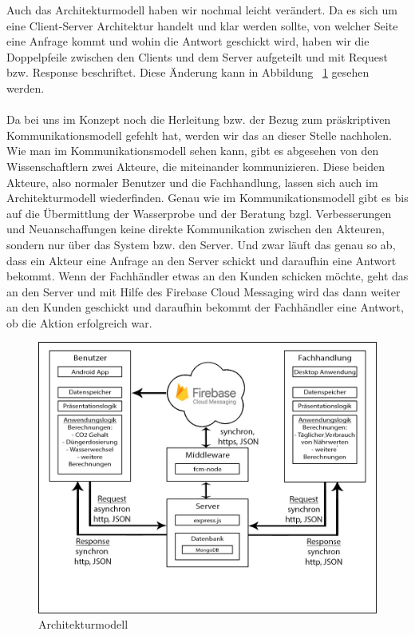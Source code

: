 Auch das Architekturmodell haben wir nochmal leicht verändert. Da es sich um eine Client-Server Architektur handelt und klar werden sollte, von welcher Seite eine Anfrage kommt und wohin die Antwort geschickt wird, haben wir die Doppelpfeile zwischen den Clients und dem Server aufgeteilt und mit Request bzw. Response beschriftet. Diese Änderung kann in Abbildung ~\ref{architektur} gesehen werden.
\\ \\
Da bei uns im Konzept noch die Herleitung bzw. der Bezug zum präskriptiven Kommunikationsmodell gefehlt hat, werden wir das an dieser Stelle nachholen. Wie man im Kommunikationsmodell sehen kann, gibt es abgesehen von den Wissenschaftlern zwei Akteure, die miteinander kommunizieren. Diese beiden Akteure, also normaler Benutzer und die Fachhandlung, lassen sich auch im Architekturmodell wiederfinden. Genau wie im Kommunikationsmodell gibt es bis auf die Übermittlung der Wasserprobe und der Beratung bzgl. Verbesserungen und Neuanschaffungen keine direkte Kommunikation zwischen den Akteuren, sondern nur über das System bzw. den Server. Und zwar läuft das genau so ab, dass ein Akteur eine Anfrage an den Server schickt und daraufhin eine Antwort bekommt. Wenn der Fachhändler etwas an den Kunden schicken möchte, geht das an den Server und mit Hilfe des Firebase Cloud Messaging wird das dann weiter an den Kunden geschickt und daraufhin bekommt der Fachhändler eine Antwort, ob die Aktion erfolgreich war.

\begin{figure}[htbp]
\centering
\includegraphics[width=\linewidth]{Architektur}
\caption{Architekturmodell}
\label{architektur}
\end{figure}

